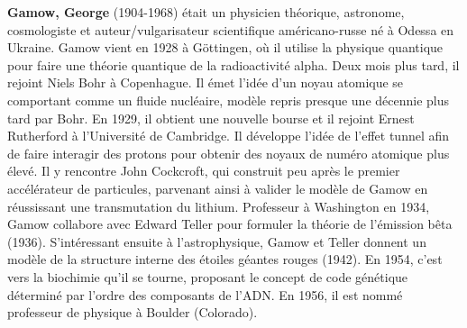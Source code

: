 \textbf{Gamow, George} (1904-1968) était un physicien théorique, astronome, cosmologiste et auteur/vulgarisateur scientifique américano-russe né à Odessa en Ukraine. Gamow vient en 1928 à Göttingen, où il utilise la physique quantique pour faire une théorie quantique de la radioactivité alpha. Deux mois plus tard, il rejoint Niels Bohr à Copenhague. Il émet l'idée d'un noyau atomique se comportant comme un fluide nucléaire, modèle repris presque une décennie plus tard par Bohr. En 1929, il obtient une nouvelle bourse et il rejoint Ernest Rutherford à l'Université de Cambridge. Il développe l'idée de l'effet tunnel afin de faire interagir des protons pour obtenir des noyaux de numéro atomique plus élevé. Il y rencontre John Cockcroft, qui construit peu après le premier accélérateur de particules, parvenant ainsi à valider le modèle de Gamow en réussissant une transmutation du lithium. Professeur à Washington en 1934, Gamow collabore avec Edward Teller pour formuler la théorie de l'émission bêta (1936). S'intéressant ensuite à l'astrophysique, Gamow et Teller donnent un modèle de la structure interne des étoiles géantes rouges (1942). En 1954, c'est vers la biochimie qu'il se tourne, proposant le concept de code génétique déterminé par l'ordre des composants de l'ADN. En 1956, il est nommé professeur de physique à Boulder (Colorado).

